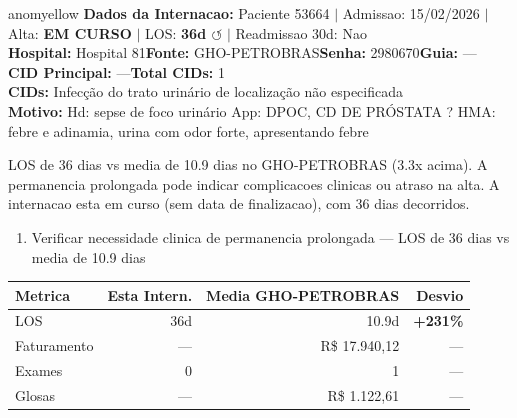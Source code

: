\documentclass[a4paper,10pt]{article}
\begin{document}
\begin{anomalycard}[Internacao 165641 | GHO-PETROBRAS | MODERADO (z=2.56)]{anomyellow}
\textbf{Dados da Internacao:} Paciente 53664 $\mid$ Admissao: 15/02/2026 $\mid$ Alta: \textcolor{anomorange}{\textbf{EM CURSO}} $\mid$ LOS: \textbf{36d \textcolor{anomorange}{$\circlearrowleft$}} $\mid$ Readmissao 30d: Nao\\
\textbf{Hospital:} Hospital 81\quad\textbf{Fonte:} GHO-PETROBRAS\quad\textbf{Senha:} 2980670\quad\textbf{Guia:} ---\\
\textbf{CID Principal:} {\small ---}\quad\textbf{Total CIDs:} 1\\

\textbf{CIDs:} {\scriptsize Infecção do trato urinário de localização não especificada}\\

\textbf{Motivo:} {\scriptsize Hd: sepse de foco urinário  App: DPOC, CD DE PRÓSTATA ?  HMA: febre e adinamia, urina com odor forte, apresentando febre}\\

\vspace{2pt}\begin{tcolorbox}[colback=severityred!20,colframe=anomyellow,title={\textbf{Interpretacao de Negocio}},fonttitle=\bfseries\small,left=4pt,right=4pt,top=3pt,bottom=3pt]
{\small LOS de 36 dias vs media de 10.9 dias no GHO-PETROBRAS (3.3x acima). A permanencia prolongada pode indicar complicacoes clinicas ou atraso na alta. A internacao esta em curso (sem data de finalizacao), com 36 dias decorridos.}
\end{tcolorbox}
\begin{tcolorbox}[colback=severityyellow!30,colframe=anomorange,title={\textbf{Recomendacoes Especificas}},fonttitle=\bfseries\small,left=4pt,right=4pt,top=3pt,bottom=3pt]
\begin{enumerate}[nosep,leftmargin=16pt]
\item {\small Verificar necessidade clinica de permanencia prolongada --- LOS de 36 dias vs media de 10.9 dias}
\end{enumerate}
\end{tcolorbox}
\begin{center}\begin{tabular}{l r r r}\toprule\textbf{Metrica} & \textbf{Esta Intern.} & \textbf{Media GHO-PETROBRAS} & \textbf{Desvio} \\\midrule
LOS & 36d & 10.9d & \textcolor{anomred}{\textbf{+231\%}} \\
Faturamento & --- & R\$ 17.940,12 & --- \\
Exames & 0 & 1 & --- \\
Glosas & --- & R\$ 1.122,61 & --- \\
\bottomrule\end{tabular}\end{center}


\end{anomalycard}
\end{document}
